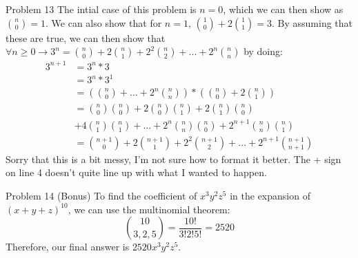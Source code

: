 \documentclass[12pt]{article}
\begin{document}
    \begin{problem}{Problem 13}
        The intial case of this problem is $n = 0$, which we can then show as $\binom{n}{0} = 1$. We can also show that
        for $n = 1$, $\binom{1}{0} + 2\binom{1}{1} = 3$. By assuming that these are true, we can then show that \newline
        $\forall n \geq 0 \rightarrow 3^n = \binom{n}{0} + 2\binom{n}{1} + 2^2\binom{n}{2} + ... + 2^n\binom{n}{n}$
        by doing:
        \begin{equation*}
            \begin{split}
                3^{n+1} &= 3^n * 3 \\
                &= 3^n * 3^1 \\
                &= \left(\binom{n}{0} + ... + 2^n\binom{n}{n}\right) * \left(\binom{n}{0} + 2\binom{n}{1}\right) \\
                &= \binom{n}{0}\binom{n}{0} + 2\binom{n}{0}\binom{n}{1} + 2\binom{n}{1}\binom{n}{0} \\
                &+ 4\binom{n}{1}\binom{n}{1} + ... + 2^n\binom{n}{n}\binom{n}{0} + 2^{n+1}\binom{n}{n}\binom{n}{1} \\
                &= \binom{n+1}{0} + 2\binom{n+1}{1} + 2^2\binom{n+1}{2} + ... + 2^{n+1}\binom{n+1}{n+1}
            \end{split}
        \end{equation*}
        Sorry that this is a bit messy, I'm not sure how to format it better. The + sign on line 4 doesn't quite
        line up with what I wanted to happen.
    \end{problem} 

    \begin{problem}{Problem 14 (Bonus)}
        To find the coefficient of $x^3y^2z^5$ in the expansion of $(x + y + z)^{10}$, we can use the multinomial theorem:
        \[\binom{10}{3, 2, 5} = \frac{10!}{3!2!5!} = 2520\]
        Therefore, our final answer is $2520x^3y^2z^5$.
    \end{problem}
\end{document}
